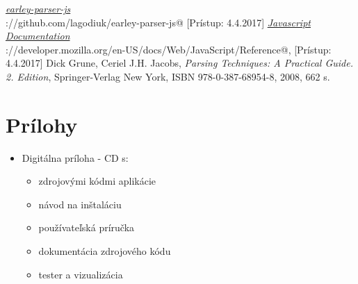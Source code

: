 \documentclass[12pt,a4paper]{report}
\theoremstyle{definition}
\theoremstyle{remark}
\begin{document}
\begin{thebibliography}{99}
\emph{\href{https://github.com/lagodiuk/earley-parser-js}{earley-parser-js}}  \\
\verb@https://github.com/lagodiuk/earley-parser-js@ [Prístup: 4.4.2017]
\emph{\href{https://developer.mozilla.org/en-US/docs/Web/JavaScript/Reference}{Javascript Documentation}} \\ \verb@https://developer.mozilla.org/en-US/docs/Web/JavaScript/Reference@, [Prístup: 4.4.2017]
Dick Grune, Ceriel J.H. Jacobs, \emph{Parsing Techniques: A Practical Guide. 2. Edition}, Springer-Verlag New York,  ISBN 978-0-387-68954-8, 2008, 662 s.
\end{thebibliography}

\chapter*{Prílohy}

\begin{itemize}
\item Digitálna príloha - CD s:
	\begin{itemize}
	\item zdrojovými kódmi aplikácie
	\item návod na inštaláciu
	\item používateľská príručka
	\item dokumentácia zdrojového kódu
	\item tester a vizualizácia
	\end{itemize}
\end{itemize}
\end{document}
